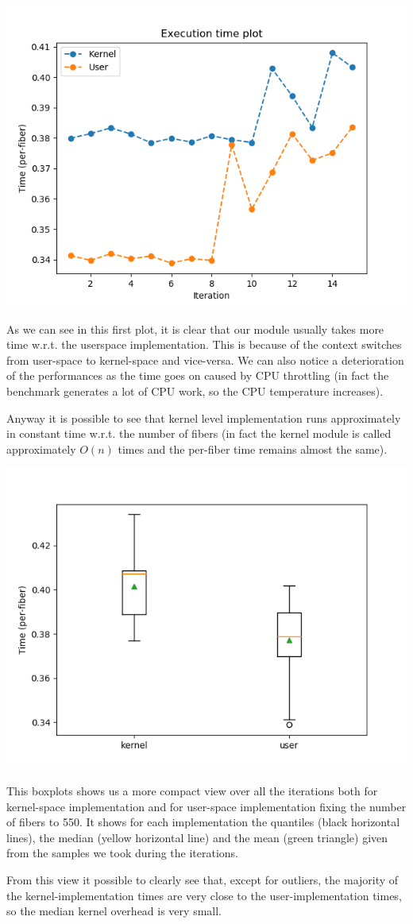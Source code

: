 \documentclass[a4paper]{article}
\begin{document}
\includegraphics[scale=0.8]{../perf/user-kernel}

As we can see in this first plot, it is clear that our module usually takes more time w.r.t. the userspace implementation. This is because of the context switches from user-space to kernel-space and vice-versa. We can also notice a deterioration of the performances as the time goes on caused by CPU throttling (in fact the benchmark generates a lot of CPU work, so the CPU temperature increases).

Anyway it is possible to see that kernel level implementation runs approximately in constant time w.r.t. the number of fibers (in fact the kernel module is called approximately $O(n)$ times and the per-fiber time remains almost the same).


\includegraphics[scale=0.8]{../perf/boxplots}

This boxplots shows us a more compact view over all the iterations both for kernel-space implementation and for user-space implementation fixing the number of fibers to 550.
It shows for each implementation the quantiles (black horizontal lines), the median (yellow horizontal line) and the mean (green triangle) given from the samples we took during the iterations.

From this view it possible to clearly see that, except for outliers, the majority of the kernel-implementation times are very close to the user-implementation times, so the median kernel overhead is very small.
\end{document}
